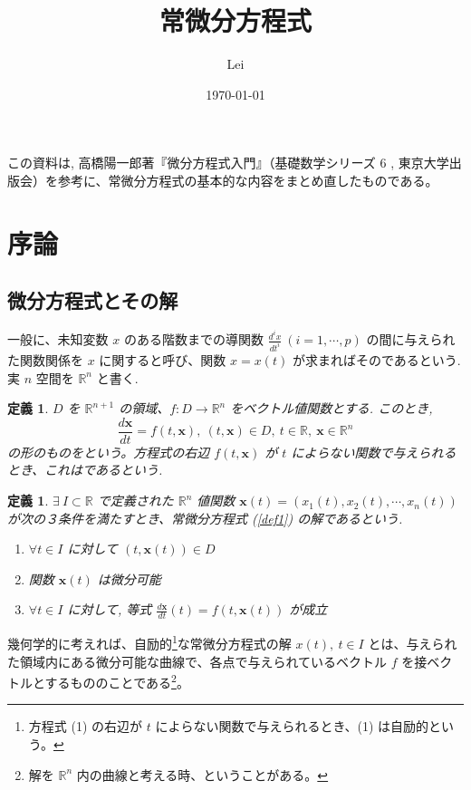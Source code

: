 \documentclass[dvipdfmx, a4paper]{jsreport}
\title{常微分方程式}
\author{Lei}
\date{\today}
\newcommand{\R}{\mathbb{R}}
\newcommand{\x}{\bm{x}}
\newtheorem{definition}[theorem]{定義}
\begin{document}
\maketitle

この資料は, 高橋陽一郎著『微分方程式入門』（基礎数学シリーズ 6 , 東京大学出版会）を参考に、常微分方程式の基本的な内容をまとめ直したものである。

\tableofcontents
\clearpage

\section{序論}

\subsection{微分方程式とその解}

一般に、未知変数 $x$ のある階数までの導関数 $\frac{d^ix}{dt^i}\ (i=1, \cdots, p)$ の間に与えられた関数関係を $x$ に関すると呼び、関数 $x=x(t)$ が求まればそのであるという. 実 $n$ 空間を $\R^n$ と書く.

\begin{definition}
    $D$ を $\R^{n+1}$ の領域、$f: D\to \R^n$ をベクトル値関数とする. このとき,
    \begin{equation}
        \label{def1}
        \frac{d\x}{dt}=f(t, \x),\ (t, \x)\in D,\ t\in\R,\ \x\in\R^n
    \end{equation}
    の形のものをという。方程式の右辺 $f(t, \x)$ が $t$ によらない関数で与えられるとき、これはであるという.
\end{definition}

\begin{definition}
    $\exists\ I\subset\R$ で定義された $\R^n$ 値関数 $\x(t)=(x_1(t), x_2(t), \cdots, x_n(t))$ が次の３条件を満たすとき、常微分方程式 (\ref{def1}) の解であるという.
    \begin{enumerate}
        \item $\forall t\in I$ に対して $(t, \x(t))\in D$
        \item 関数 $\x(t)$ は微分可能
        \item $\forall t\in I$ に対して, 等式 $\frac{d\x}{dt}(t)=f(t, \x(t))$ が成立
    \end{enumerate}
\end{definition}

幾何学的に考えれば、自励的\footnote{方程式 (1) の右辺が $t$ によらない関数で与えられるとき、(1) は自励的という。}な常微分方程式の解 $x(t),\ t\in I$ とは、与えられた領域内にある微分可能な曲線で、各点で与えられているベクトル $f$ を接ベクトルとするもののことである\footnote{解を $\R^n$ 内の曲線と考える時、ということがある。}。
\end{document}
